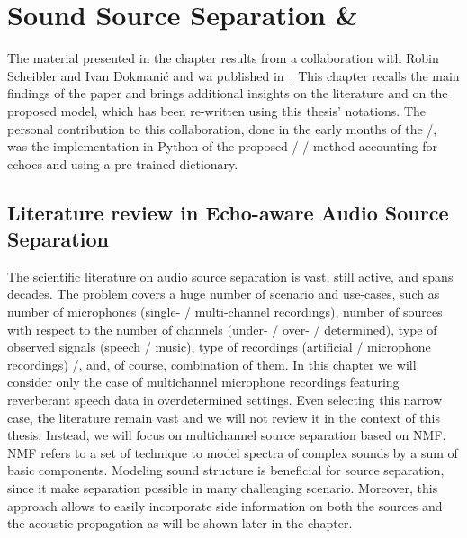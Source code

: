 \chapter{Sound Source Separation \& }\label{chap:separake}

 \synopsisChSeparake

\mynewline
The material presented in the chapter results from a collaboration with Robin Scheibler and Ivan Dokmani\'{c} and wa published in~\cite{scheibler2018separake}.
This chapter recalls the main findings of the paper and brings additional insights on the literature and on the proposed model, which has been re-written using this thesis' notations.
The personal contribution to this collaboration, done in the early months of the \PhD/, was the implementation in Python of the proposed \EMdef/-\NMF/ method accounting for echoes and using a pre-trained dictionary.

\section{Literature review in Echo-aware Audio Source Separation}

The scientific literature on audio source separation is vast, still active, and spans decades.
The problem covers a huge number of scenario and use-cases, such as number of microphones (single- \vs/ multi-channel recordings),
number of sources with respect to the number of channels (under- \vs/ over- \vs/ determined),
type of observed signals (speech \vs/ music), type of recordings (artificial \vs/ microphone recordings) \etc/, and, of course, combination of them.
In this chapter we will consider only the case of multichannel microphone recordings featuring reverberant speech data in overdetermined settings.
Even selecting this narrow case, the literature remain vast and we will not review it in the context of this thesis.
Instead, we will focus on multichannel source separation based on \acf{NMF}.
\ac{NMF} refers to a set of technique to model spectra of complex sounds by a sum of basic components.
Modeling sound structure is beneficial for source separation, since it make separation possible in many challenging scenario.
Moreover, this approach allows to easily incorporate side information on both the sources and the acoustic propagation as will be shown later in the chapter.

